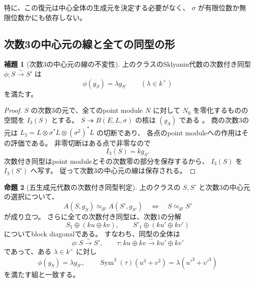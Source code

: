 \documentclass[a4paper,11pt]{ltjsarticle}
\theoremstyle{definition}
\newtheorem{theorem}{命題}[section]
\newtheorem{lemma}[theorem]{補題}
\newcommand{\Sym}{\operatorname{Sym}}
\begin{document}
特に、この復元は中心全体の生成元を決定する必要がなく、
$\sigma$ が有限位数か無限位数かにも依存しない。

\subsection{次数3の中心元の線と全ての同型の形}

\begin{lemma}[次数3の中心元の線の不変性]\label{lem:canonical-central-line}
上のクラスのSklyanin代数の次数付き同型
$\phi:S\xrightarrow{\sim}S'$ は
\[
 \phi(g_S)=\lambda g_{S'}\qquad(\lambda\in k^\times)
\]
を満たす。
\end{lemma}

\begin{proof}
$S$ の次数3の元で、全てのpoint module $N$ に対して
$N_0$ を零化するものの空間を $I_3(S)$ とする。
$S\twoheadrightarrow B(E,L,\sigma)$ の核は $(g_S)$ である
\cite[Lemma 2.19]{WWY}。
商の次数3の元は $L_3=L\otimes\sigma^*L\otimes(\sigma^2)^*L$ の切断であり、
各点のpoint moduleへの作用はその評価である。
非零切断はある点で非零なので
\[
 I_3(S)=k g_S.
\]
次数付き同型はpoint moduleとその次数零の部分を保存するから、
$I_3(S)$ を $I_3(S')$ へ写す。
従って次数3の中心元の線は保存される。
\end{proof}

\begin{theorem}[五生成元代数の次数付き同型判定]\label{thm:five-generator-isom}
上のクラスの $S,S'$ と次数3の中心元の選択について、
\begin{equation}\label{eq:five-generator-isom}
 A(S,g_S)\simeq_{\mathrm{gr}}A(S',g_{S'})
 \quad\Longleftrightarrow\quad
 S\simeq_{\mathrm{gr}}S'
\end{equation}
が成り立つ。
さらに全ての次数付き同型は、次数1の分解
\[
 S_1\oplus(ku\oplus kv),\qquad S'_1\oplus(ku'\oplus kv')
\]
についてblock diagonalである。
すなわち、同型の全体は
\[
 \phi:S\xrightarrow{\sim}S',\qquad
 \tau:ku\oplus kv\xrightarrow{\sim}ku'\oplus kv'
\]
であって、ある $\lambda\in k^\times$ に対し
\begin{equation}\label{eq:five-generator-iso-pairs}
 \phi(g_S)=\lambda g_{S'},\qquad
 \Sym^3(\tau)(u^3+v^3)=\lambda(u'^3+v'^3)
\end{equation}
を満たす組と一致する。
\end{theorem}
\end{document}
